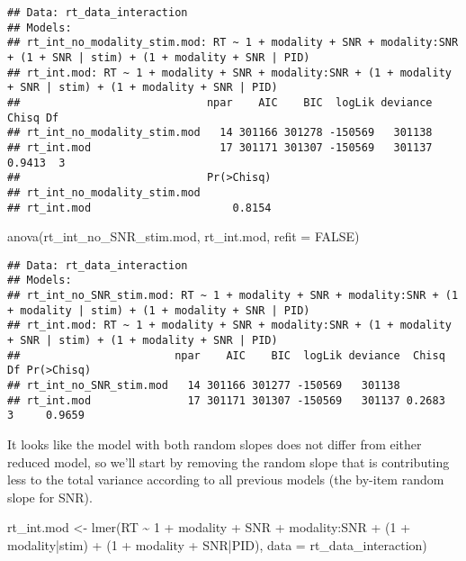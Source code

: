 \documentclass[
]{article}
\newenvironment{Shaded}{\begin{snugshade}}{\end{snugshade}}
\newcommand{\AttributeTok}[1]{\textcolor[rgb]{0.77,0.63,0.00}{#1}}
\newcommand{\ConstantTok}[1]{\textcolor[rgb]{0.00,0.00,0.00}{#1}}
\newcommand{\DecValTok}[1]{\textcolor[rgb]{0.00,0.00,0.81}{#1}}
\newcommand{\FunctionTok}[1]{\textcolor[rgb]{0.00,0.00,0.00}{#1}}
\newcommand{\NormalTok}[1]{#1}
\newcommand{\OtherTok}[1]{\textcolor[rgb]{0.56,0.35,0.01}{#1}}
\newcommand{\SpecialCharTok}[1]{\textcolor[rgb]{0.00,0.00,0.00}{#1}}
\begin{document}
\begin{verbatim}
## Data: rt_data_interaction
## Models:
## rt_int_no_modality_stim.mod: RT ~ 1 + modality + SNR + modality:SNR + (1 + SNR | stim) + (1 + modality + SNR | PID)
## rt_int.mod: RT ~ 1 + modality + SNR + modality:SNR + (1 + modality + SNR | stim) + (1 + modality + SNR | PID)
##                             npar    AIC    BIC  logLik deviance  Chisq Df
## rt_int_no_modality_stim.mod   14 301166 301278 -150569   301138          
## rt_int.mod                    17 301171 301307 -150569   301137 0.9413  3
##                             Pr(>Chisq)
## rt_int_no_modality_stim.mod           
## rt_int.mod                      0.8154
\end{verbatim}

\begin{Shaded}
\begin{Highlighting}[]
\FunctionTok{anova}\NormalTok{(rt\_int\_no\_SNR\_stim.mod, rt\_int.mod, }\AttributeTok{refit =} \ConstantTok{FALSE}\NormalTok{)}
\end{Highlighting}
\end{Shaded}

\begin{verbatim}
## Data: rt_data_interaction
## Models:
## rt_int_no_SNR_stim.mod: RT ~ 1 + modality + SNR + modality:SNR + (1 + modality | stim) + (1 + modality + SNR | PID)
## rt_int.mod: RT ~ 1 + modality + SNR + modality:SNR + (1 + modality + SNR | stim) + (1 + modality + SNR | PID)
##                        npar    AIC    BIC  logLik deviance  Chisq Df Pr(>Chisq)
## rt_int_no_SNR_stim.mod   14 301166 301277 -150569   301138                     
## rt_int.mod               17 301171 301307 -150569   301137 0.2683  3     0.9659
\end{verbatim}

It looks like the model with both random slopes does not differ from
either reduced model, so we'll start by removing the random slope that
is contributing less to the total variance according to all previous
models (the by-item random slope for SNR).

\begin{Shaded}
\begin{Highlighting}[]
\NormalTok{rt\_int.mod }\OtherTok{\textless{}{-}} \FunctionTok{lmer}\NormalTok{(RT }\SpecialCharTok{\textasciitilde{}} \DecValTok{1} \SpecialCharTok{+}\NormalTok{ modality }\SpecialCharTok{+}\NormalTok{ SNR }\SpecialCharTok{+}\NormalTok{ modality}\SpecialCharTok{:}\NormalTok{SNR }\SpecialCharTok{+}
\NormalTok{                     (}\DecValTok{1} \SpecialCharTok{+}\NormalTok{ modality}\SpecialCharTok{|}\NormalTok{stim) }\SpecialCharTok{+}\NormalTok{ (}\DecValTok{1} \SpecialCharTok{+}\NormalTok{ modality }\SpecialCharTok{+}\NormalTok{ SNR}\SpecialCharTok{|}\NormalTok{PID), }
                   \AttributeTok{data =}\NormalTok{ rt\_data\_interaction)}
\end{Highlighting}
\end{Shaded}
\end{document}
